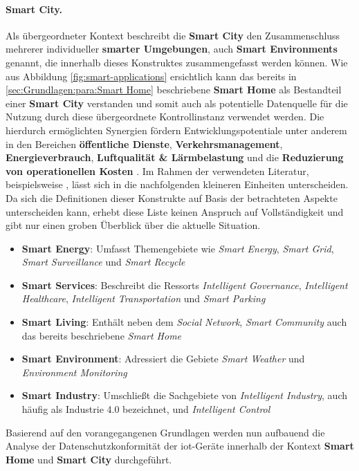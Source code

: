 \paragraph{Smart City.}
\label{sec:Grundlagen:para:Smart City}
Als übergeordneter Kontext beschreibt die \textbf{Smart City} den Zusammenschluss mehrerer individueller \textbf{smarter Umgebungen}, auch \textbf{Smart Environments} genannt, die innerhalb dieses Konstruktes zusammengefasst werden können. Wie aus Abbildung \ref{fig:smart-applications} ersichtlich kann das bereits in \ref{sec:Grundlagen:para:Smart Home} beschriebene \textbf{Smart Home} als Bestandteil einer \textbf{Smart City} verstanden und somit auch als potentielle Datenquelle für die Nutzung durch diese übergeordnete Kontrollinstanz verwendet werden. Die hierdurch ermöglichten Synergien fördern Entwicklungspotentiale unter anderem in den Bereichen \textbf{öffentliche Dienste}, \textbf{Verkehrsmanagement}, \textbf{Energieverbrauch}, \textbf{Luftqualität \& Lärmbelastung} und die \textbf{Reduzierung von operationellen Kosten} \cite{Bastos2018}.
Im Rahmen der verwendeten Literatur, beispielsweise \cite{Bastos2018,Cui2018,SecPrivSmartCity2021}, lässt sich in die nachfolgenden kleineren Einheiten unterscheiden. Da sich die Definitionen dieser Konstrukte auf Basis der betrachteten Aspekte unterscheiden kann, erhebt diese Liste keinen Anspruch auf Vollständigkeit und gibt nur einen groben Überblick über die aktuelle Situation.

\begin{itemize}
	\item \textbf{Smart Energy}: Umfasst Themengebiete wie \textit{Smart Energy}, \textit{Smart Grid}, \textit{Smart Surveillance} und \textit{Smart Recycle}
	\item \textbf{Smart Services}: Beschreibt die Ressorts \textit{Intelligent Governance}, \textit{Intelligent Healthcare}, \textit{Intelligent Transportation} und \textit{Smart Parking}
	\item \textbf{Smart Living}: Enthält neben dem \textit{Social Network}, \textit{Smart Community} auch das bereits beschriebene \textit{Smart Home}
	\item \textbf{Smart Environment}: Adressiert die Gebiete \textit{Smart Weather} und \textit{Environment Monitoring}
	\item \textbf{Smart Industry}: Umschließt die Sachgebiete von \textit{Intelligent Industry}, auch häufig als Industrie 4.0 bezeichnet, und \textit{Intelligent Control}
\end{itemize}

\noindent Basierend auf den vorangegangenen Grundlagen werden nun aufbauend die Analyse der Datenschutzkonformität der \ac{iot}-Geräte innerhalb der Kontext \textbf{Smart Home} und \textbf{Smart City} durchgeführt.
